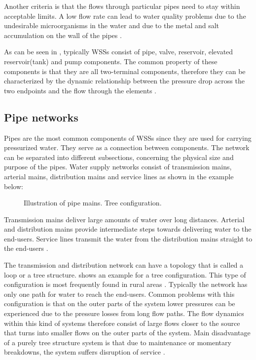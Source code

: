 Another criteria is that the flows through particular pipes need to stay within acceptable limits. A low flow rate can lead to water quality problems due to the undesirable microorganisms in the water and due to the metal and salt accumulation on the wall of the pipes \cite{walski2003advanced}. 

As can be seen in , typically WSSs consist of pipe, valve, reservoir, elevated reservoir(tank) and pump components. The common property of these components is that they are all two-terminal components, therefore they can be characterized by the dynamic relationship between the pressure drop across the two endpoints and the flow through the elements \cite{master_aau}. 

\subsection{Pipe networks}
\label{pipe_networks}

Pipes are the most common components of WSSs since they are used for carrying pressurized water. They serve as a connection between components. The network can be separated into different subsections, concerning the physical size and purpose of the pipes. Water supply networks consist of transmission mains, arterial mains, distribution mains and service lines as shown in the example below: 

\begin{figure}[H]
\centering
 
\caption{Illustration of pipe mains. Tree configuration.}
\label{fig:pipemain_example}
\end{figure}

Transmission mains deliver large amounts of water over long distances. Arterial and distribution mains provide intermediate steps towards delivering water to the end-users. Service lines transmit the water from the distribution mains straight to the end-users \cite{grigg2012water}.

The transmission and distribution network can have a topology that is called a loop or a tree structure.  shows an example for a tree configuration. This type of configuration is most frequently found in rural areas \cite{mays}. Typically the network has only one path for water to reach the end-users. Common problems with this configuration is that on the outer parts of the system lower pressures can be experienced due to the pressure losses from long flow paths. The flow dynamics within this kind of systems therefore consist of large flows closer to the source that turns into smaller flows on the outer parts of the system. Main disadvantage of a purely tree structure system is that due to maintenance or momentary breakdowns, the system suffers disruption of service \cite{mays}. 

